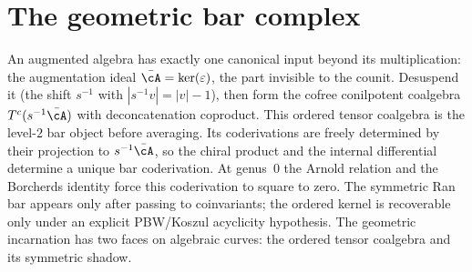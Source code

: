 \chapter{The geometric bar complex}
\label{chap:bar-cobar}\label{ch:cobar}
\label{chap:bar-construction}

\providecommand{\KZ}{\mathrm{KZ}}
\providecommand{\Arn}{\mathrm{Arnold}}
\providecommand{\dbar}{d_{\mathrm{bar}}}
\providecommand{\BRST}{\mathrm{BRST}}
\providecommand{\ConnConf}{\mathsf{ConnConf}}


An augmented algebra has exactly one canonical input beyond its
multiplication: the augmentation ideal
$\bar\cA=\ker(\varepsilon)$, the part invisible to the counit.
Desuspend it (the shift $s^{-1}$ with $|s^{-1}v|=|v|-1$), then form
the cofree conilpotent coalgebra
$T^c(s^{-1}\bar\cA)$ with deconcatenation coproduct. This ordered
tensor coalgebra is the level-$2$ bar object before averaging. Its coderivations are
freely determined by their projection to $s^{-1}\bar\cA$, so the
chiral product and the internal differential determine a unique bar
coderivation. At genus~$0$ the Arnold relation and the Borcherds
identity force this coderivation to square to zero. The symmetric Ran
bar appears only after passing to coinvariants; the ordered kernel is
recoverable only under an explicit PBW/Koszul acyclicity hypothesis.
The geometric incarnation has two faces on algebraic curves: the
ordered tensor coalgebra and its symmetric shadow.

